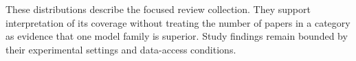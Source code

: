 \documentclass[journal,letterpaper]{IEEEtran}
\begin{document}
These distributions describe the focused review collection. They support interpretation of its coverage without treating the number of papers in a category as evidence that one model family is superior. Study findings remain bounded by their experimental settings and data-access conditions.




\end{document}
